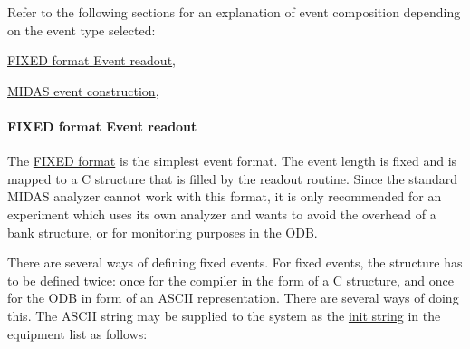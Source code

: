 Refer to the following sections for an explanation of event composition depending on the event type selected:
\begin{DoxyItemize}
\item \hyperlink{FE_bank_construction_FE_FIXED_event_readout}{FIXED format Event readout},
\item \hyperlink{FE_bank_construction_FE_MIDAS_event_construction}{MIDAS event construction},
\end{DoxyItemize}

\par
 

 \par
 \label{FE_bank_construction_idx_format_FIXED}
\hypertarget{FE_bank_construction_idx_format_FIXED}{}
 \label{FE_bank_construction_idx_event_readout_format_fixed}
\hypertarget{FE_bank_construction_idx_event_readout_format_fixed}{}
\hypertarget{FE_bank_construction_FE_FIXED_event_readout}{}\paragraph{FIXED format Event readout}\label{FE_bank_construction_FE_FIXED_event_readout}
The \hyperlink{FE_table_FE_tbl_Format}{FIXED format} is the simplest event format. The event length is fixed and is mapped to a C structure that is filled by the readout routine. Since the standard MIDAS analyzer cannot work with this format, it is only recommended for an experiment which uses its own analyzer and wants to avoid the overhead of a bank structure, or for monitoring purposes in the ODB.

\par
 There are several ways of defining fixed events. For fixed events, the structure has to be defined twice: once for the compiler in the form of a C structure, and once for the ODB in form of an ASCII representation. There are several ways of doing this. The ASCII string may be supplied to the system as the \hyperlink{FE_table_FE_tbl_InitString}{init string} in the equipment list as follows:

